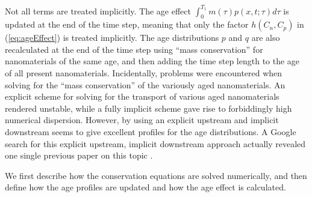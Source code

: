 \documentclass[nanomaterials,article,submit,moreauthors,pdftex]{Definitions/mdpi}
\begin{document}
Not all terms are treated implicitly. The age effect $\int^{T_1}_{0}m(\tau)p(x,t;\tau)d\tau$ is updated at the end of the time step, meaning that only the factor $h(C_n,C_p)$ in (\ref{eq:ageEffect}) is treated implicitly. The age distributions $p$ and $q$ are also recalculated at the end of the time step using “mass conservation” for nanomaterials of the same age, and then adding the time step length to the age of all present nanomaterials. Incidentally, problems were encountered when solving for the “mass conservation” of the variously aged nanomaterials.  An explicit scheme for solving for the transport of various aged nanomaterials rendered unstable, while a fully implicit scheme gave rise to forbiddingly high numerical dispersion. However, by using an explicit upstream and implicit downstream seems to give excellent profiles for the age distributions. A Google search for this explicit upstream, implicit downstream approach actually revealed one single previous paper on this topic \citep{Flatten2008}. 

We first describe how the conservation equations are solved numerically, and then define how the age profiles are updated and how the age effect is calculated.
\end{document}

